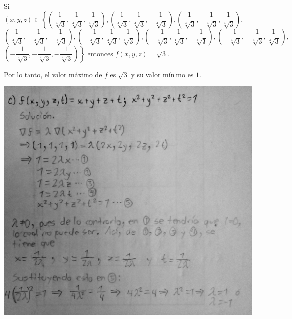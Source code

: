 \documentclass[fleqn, 12pt]{article}
\begin{document}
\begin{list}{\bfseries Ejercicio}{ \addtolength{\itemindent}{-1mm}%
    \addtolength{\labelsep}{-1mm}%
    \addtolength{\leftmargin}{-1cm}%
    \addtolength{\labelwidth}{-1cm} }
\begin{enumerate}[a)]
        Si $ (x,y,z) \in \left\lbrace \left( \dfrac{1}{\sqrt[4]{3}}, \dfrac{1}{\sqrt[4]{3}}, \dfrac{1}{\sqrt[4]{3}} \right), \left( \dfrac{1}{\sqrt[4]{3}}, \dfrac{1}{\sqrt[4]{3}}, - \dfrac{1}{\sqrt[4]{3}} \right), \left( \dfrac{1}{\sqrt[4]{3}}, - \dfrac{1}{\sqrt[4]{3}}, \dfrac{1}{\sqrt[4]{3}} \right), \right. $ \\
        $ \left( \dfrac{1}{\sqrt[4]{3}}, - \dfrac{1}{\sqrt[4]{3}}, - \dfrac{1}{\sqrt[4]{3}} \right), \left( - \dfrac{1}{\sqrt[4]{3}}, \dfrac{1}{\sqrt[4]{3}}, \dfrac{1}{\sqrt[4]{3}} \right), \left( - \dfrac{1}{\sqrt[4]{3}}, \dfrac{1}{\sqrt[4]{3}}, - \dfrac{1}{\sqrt[4]{3}} \right), \left( - \dfrac{1}{\sqrt[4]{3}}, - \dfrac{1}{\sqrt[4]{3}}, \dfrac{1}{\sqrt[4]{3}} \right), $ \\
        $ \left. \left( - \dfrac{1}{\sqrt[4]{3}}, - \dfrac{1}{\sqrt[4]{3}}, - \dfrac{1}{\sqrt[4]{3}} \right) \right\rbrace $ entonces $ f(x,y,z) = \sqrt{3} $.

        Por lo tanto, el valor máximo de $ f $ es $ \sqrt{3} $ y su valor mínimo es $ 1 $.

        \centering
        \includegraphics[width = 1.0\linewidth]{Ejercicio c1.jpg}
       

\end{enumerate}
\end{list}
\end{document}
